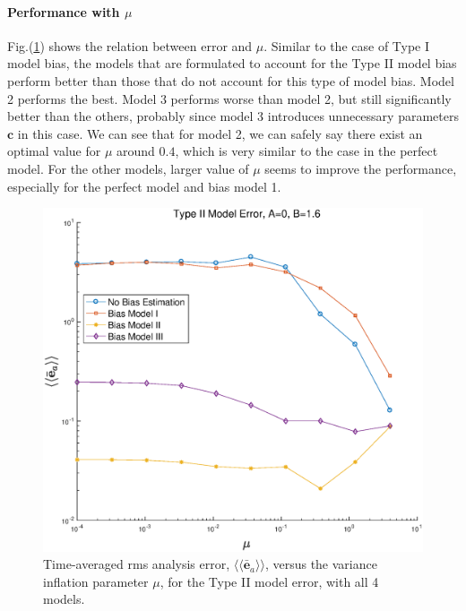 \documentclass[twocolumn]{article}
\begin{document}
\paragraph{Performance with $\mu$}
Fig.(\ref{AErrVsMuM2.1}) shows the relation between error and $\mu$. Similar to the case of Type I model bias, the models that are formulated to account for the Type II model bias perform better than those that do not account for this type of model bias. Model 2 performs the best. Model 3 performs worse than model 2, but still significantly better than the others, probably since model 3 introduces unnecessary parameters $\pmb{c}$ in this case. We can see that for model 2, we can safely say there exist an optimal value for $\mu$ around $0.4$, which is very similar to the case in the perfect model. For the other models, larger value of $\mu$ seems to improve the performance, especially for the perfect model and bias model 1.
\begin{figure} 
\centering
\includegraphics[scale=0.3]{Figures/AErrVsMuM2_1}
\caption{Time-averaged rms analysis error, $\langle\langle\bar{\pmb{e}}_a\rangle\rangle$, versus the variance inflation parameter $\mu$, for the Type II model error, with all 4 models.}
\label{AErrVsMuM2.1}
\end{figure}
\end{document}
